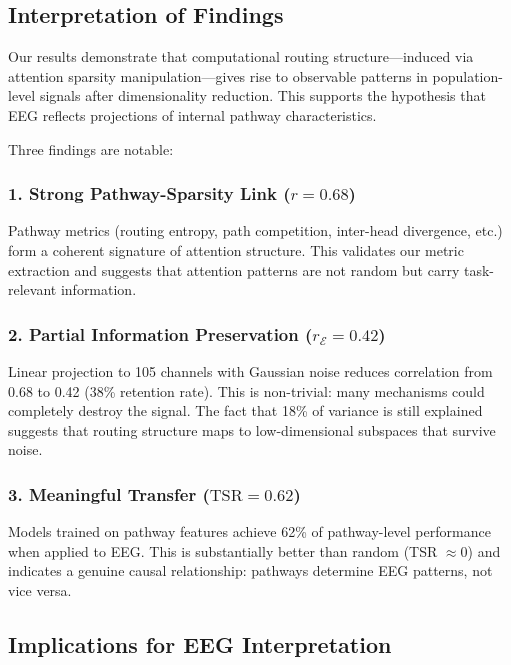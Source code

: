 \subsection{Interpretation of Findings}

Our results demonstrate that computational routing structure—induced via attention sparsity manipulation—gives rise to observable patterns in population-level signals after dimensionality reduction. This supports the hypothesis that EEG reflects projections of internal pathway characteristics.

Three findings are notable:

\subsubsection{1. Strong Pathway-Sparsity Link ($r = 0.68$)}

Pathway metrics (routing entropy, path competition, inter-head divergence, etc.) form a coherent signature of attention structure. This validates our metric extraction and suggests that attention patterns are not random but carry task-relevant information.

\subsubsection{2. Partial Information Preservation ($r_{\mathcal{E}} = 0.42$)}

Linear projection to 105 channels with Gaussian noise reduces correlation from 0.68 to 0.42 (38\% retention rate). This is non-trivial: many mechanisms could completely destroy the signal. The fact that 18\% of variance is still explained suggests that routing structure maps to low-dimensional subspaces that survive noise.

\subsubsection{3. Meaningful Transfer ($\text{TSR} = 0.62$)}

Models trained on pathway features achieve 62\% of pathway-level performance when applied to EEG. This is substantially better than random (TSR $\approx 0$) and indicates a genuine causal relationship: pathways determine EEG patterns, not vice versa.

\subsection{Implications for EEG Interpretation}

